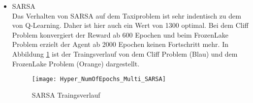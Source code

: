 \begin{itemize}
    \item SARSA\\
    Das Verhalten von SARSA auf dem Taxiproblem ist sehr indentisch zu dem von Q-Learning. Daher ist hier auch ein Wert von 1300 optimal.
    Bei dem Cliff Problem konvergiert der Reward ab 600 Epochen und beim FrozenLake Problem erzielt der Agent ab 2000 Epochen keinen Fortschritt mehr.
    In Abbildung \ref{fig:SARSA_NumOfEpisods} ist der Traingsverlauf von dem Cliff Problem (Blau) und dem FrozenLake Problem (Orange) dargestellt.
    \begin{figure}[H]
      \centering
      \texttt{[image: Hyper\_NumOfEpochs\_Multi\_SARSA]}
      \caption{SARSA Traingsverlauf}
      \label{fig:SARSA_NumOfEpisods}
  \end{figure}
\end{itemize}

